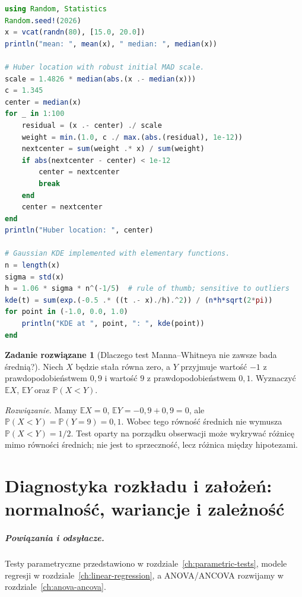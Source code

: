 \documentclass[11pt,a4paper,oneside]{report}
\numberwithin{equation}{chapter}
\theoremstyle{plain}
\theoremstyle{definition}
\newtheorem{zadanie}{Zadanie rozwiązane}[chapter]
\theoremstyle{remark}
\newcommand{\Prob}{\mathbb P}
\newcommand{\E}{\mathbb E}
\begin{document}
\begin{lstlisting}[language=Julia,caption={Kompletny program: odporna estymacja i jądrowa estymacja gęstości (Julia, Random i Statistics).}]
using Random, Statistics
Random.seed!(2026)
x = vcat(randn(80), [15.0, 20.0])
println("mean: ", mean(x), " median: ", median(x))

# Huber location with robust initial MAD scale.
scale = 1.4826 * median(abs.(x .- median(x)))
c = 1.345
center = median(x)
for _ in 1:100
    residual = (x .- center) ./ scale
    weight = min.(1.0, c ./ max.(abs.(residual), 1e-12))
    nextcenter = sum(weight .* x) / sum(weight)
    if abs(nextcenter - center) < 1e-12
        center = nextcenter
        break
    end
    center = nextcenter
end
println("Huber location: ", center)

# Gaussian KDE implemented with elementary functions.
n = length(x)
sigma = std(x)
h = 1.06 * sigma * n^(-1/5)  # rule of thumb; sensitive to outliers
kde(t) = sum(exp.(-0.5 .* ((t .- x)./h).^2)) / (n*h*sqrt(2*pi))
for point in (-1.0, 0.0, 1.0)
    println("KDE at ", point, ": ", kde(point))
end
\end{lstlisting}

\begin{zadanie}[Dlaczego test Manna--Whitneya nie zawsze bada średnią?]
Niech $X$ będzie stała równa zero, a $Y$ przyjmuje
wartość $-1$ z prawdopodobieństwem $0{,}9$ i wartość
$9$ z prawdopodobieństwem $0{,}1$. Wyznaczyć
$\E X$, $\E Y$ oraz $\Prob(X<Y)$.
\par\emph{Rozwiązanie.} Mamy $\E X=0$,
$\E Y=-0{,}9+0{,}9=0$, ale
$\Prob(X<Y)=\Prob(Y=9)=0{,}1$.
Wobec tego równość średnich nie wymusza
$\Prob(X<Y)=1/2$. Test oparty na porządku obserwacji
może wykrywać różnicę mimo równości średnich;
nie jest to sprzeczność, lecz różnica między hipotezami.
\end{zadanie}


\chapter{Diagnostyka rozkładu i założeń: normalność, wariancje i zależność}
\label{ch:diagnostics}
\paragraph{Powiązania i odsyłacze.} Testy parametryczne przedstawiono w rozdziale~\ref{ch:parametric-tests}, modele regresji w rozdziale~\ref{ch:linear-regression}, a ANOVA/ANCOVA rozwijamy w rozdziale~\ref{ch:anova-ancova}.
\end{document}
